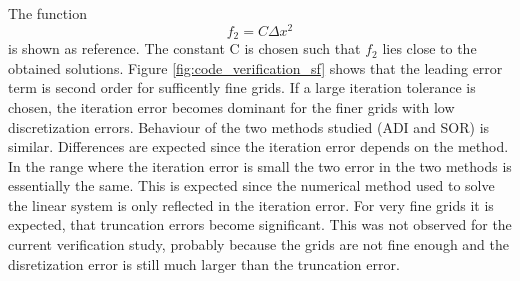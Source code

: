 %
The function 
\begin{equation}
f_2 = C \Delta x^2
\end{equation}
is shown as reference. The constant C is chosen such that $f_2$ lies close to the obtained solutions.  Figure \ref{fig:code_verification_sf} shows that the leading error term is second order for sufficently fine grids. If a large iteration tolerance is chosen, the iteration error becomes dominant for the finer grids with low discretization errors.  Behaviour of the two methods studied (ADI and SOR) is similar. Differences are expected since the iteration error depends on the method. In the range where the iteration error is small the two error in the two methods is essentially the same. This is expected since the numerical method used to solve the linear system is only reflected in the iteration error. For very fine grids it is expected, that truncation errors become significant. This was not observed for the current verification study, probably because the grids are not fine enough and the disretization error is still much larger than the truncation error.
%
%

